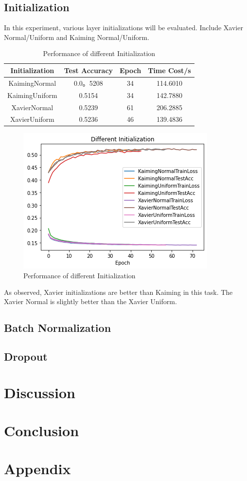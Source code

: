 \documentclass{article}[12pt]
\begin{document}
\subsection{Initialization}

    In this experiment, various layer initializations will be evaluated.
    Include Xavier Normal/Uniform and Kaiming Normal/Uniform.

\begin{table}[H]\label{tab:table}
    \centering
    \begin{tabular}{|c|c|c|c|}
        \hline
        Initialization & Test Accuracy & Epoch & Time Cost/s\\\hline
        KaimingNormal & 0.0。5208 & 34 & 114.6010\\\hline
        KaimingUniform & 0.5154 & 34 & 142.7880\\\hline
        XavierNormal & 0.5239 & 61 & 206.2885\\\hline
        XavierUniform & 0.5236 & 46 & 139.4836\\\hline
    \end{tabular}
    \caption{Performance of different Initialization}
\end{table}

\begin{figure}[H]
    \centering
    \includegraphics[scale=0.5]{Figures/6.initialization/download}
    \caption{Performance of different Initialization}
\end{figure}

    As observed, Xavier initializations are better than Kaiming in this task.
    The Xavier Normal is slightly better than the Xavier Uniform.

\subsection{Batch Normalization}




\subsection{Dropout}

\section{Discussion}\label{sec:discussion}


\section{Conclusion}\label{sec:conclusion}


\section{Appendix}\label{sec:appendix}
\end{document}
